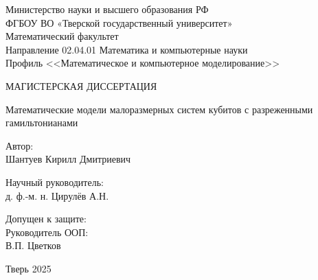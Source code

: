 \documentclass[a4paper]{report}
\begin{document}
\begin{titlepage}
	\begin{center}
		Министерство науки и высшего образования РФ\\
		ФГБОУ ВО «Тверской государственный университет»\\
		Математический факультет\\
		Направление 02.04.01 Математика и компьютерные науки\\
		Профиль <<Математическое и компьютерное моделирование>>	
	\end{center}
	
	\vspace{2.5cm}
	\begin{center}
	
		{МАГИСТЕРСКАЯ ДИССЕРТАЦИЯ}
		
		
		\vspace{1.0cm}
		\large{Математические модели малоразмерных систем кубитов с разреженными гамильтонианами}
		
		
		\vspace{1.0cm}
	\end{center}
	
	
	
	\begin{flushright}
		\begin{minipage}{80mm}
			Автор:\\
			Шантуев Кирилл Дмитриевич
			
			\vspace{1.0cm}
			Научный руководитель:\\
			д. ф.-м. н. Цирулёв А.Н.
			
		\end{minipage}
	\end{flushright}
	
	
	\vspace{1.3cm}
	\noindent Допущен к защите:\\
	Руководитель ООП:\\[1cm]
	\underline{\qquad \qquad \qquad \qquad \qquad }
    В.П. Цветков \\
	\vspace{2.3cm}
	
	
	
	\begin{center}
		Тверь 2025
	\end{center}
	
	\date{}
\end{titlepage}

\setcounter{page}{2}
\end{document}
